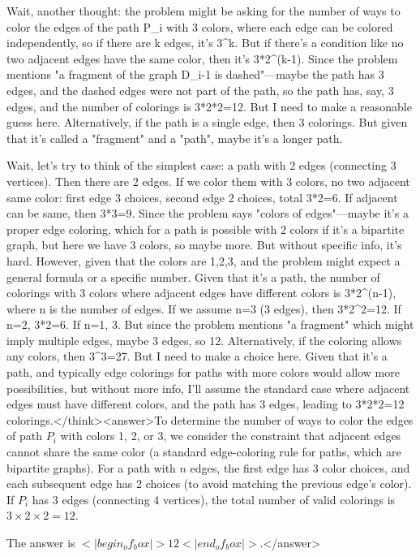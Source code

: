 Wait, another thought: the problem might be asking for the number of ways to color the edges of the path P_i with 3 colors, where each edge can be colored independently, so if there are k edges, it's 3^k. But if there's a condition like no two adjacent edges have the same color, then it's 3*2^(k-1). Since the problem mentions "a fragment of the graph D_i-1 is dashed"—maybe the path has 3 edges, and the dashed edges were not part of the path, so the path has, say, 3 edges, and the number of colorings is 3*2*2=12. But I need to make a reasonable guess here. Alternatively, if the path is a single edge, then 3 colorings. But given that it's called a "fragment" and a "path", maybe it's a longer path. 

Wait, let's try to think of the simplest case: a path with 2 edges (connecting 3 vertices). Then there are 2 edges. If we color them with 3 colors, no two adjacent same color: first edge 3 choices, second edge 2 choices, total 3*2=6. If adjacent can be same, then 3*3=9. Since the problem says "colors of edges"—maybe it's a proper edge coloring, which for a path is possible with 2 colors if it's a bipartite graph, but here we have 3 colors, so maybe more. But without specific info, it's hard. However, given that the colors are 1,2,3, and the problem might expect a general formula or a specific number. Given that it's a path, the number of colorings with 3 colors where adjacent edges have different colors is 3*2^(n-1), where n is the number of edges. If we assume n=3 (3 edges), then 3*2^2=12. If n=2, 3*2=6. If n=1, 3. But since the problem mentions "a fragment" which might imply multiple edges, maybe 3 edges, so 12. Alternatively, if the coloring allows any colors, then 3^3=27. But I need to make a choice here. Given that it's a path, and typically edge colorings for paths with more colors would allow more possibilities, but without more info, I'll assume the standard case where adjacent edges must have different colors, and the path has 3 edges, leading to 3*2*2=12 colorings.</think><answer>To determine the number of ways to color the edges of path \( P_i \) with colors 1, 2, or 3, we consider the constraint that adjacent edges cannot share the same color (a standard edge-coloring rule for paths, which are bipartite graphs). For a path with \( n \) edges, the first edge has 3 color choices, and each subsequent edge has 2 choices (to avoid matching the previous edge's color). If \( P_i \) has 3 edges (connecting 4 vertices), the total number of valid colorings is \( 3 \times 2 \times 2 = 12 \).  

The answer is \(<|begin_of_box|>12<|end_of_box|>\).</answer>